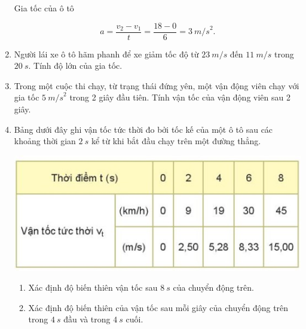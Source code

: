 \begin{enumerate}[label=\bfseries Bài \arabic*:]
{		Gia tốc của ô tô
		
		$$a = \dfrac{v_2 - v_1}{t} = \dfrac{18 - 0}{6} = \SI{3}{m/s}^2.$$
	}
	\item {}
	
	{
		Người lái xe ô tô hãm phanh để xe giảm tốc độ từ $\SI{23}{m/s}$ đến $\SI{11}{m/s}$ trong $\SI{20}{s}$. Tính độ lớn của gia tốc.
	}
	\item {}
	
	{
		Trong một cuộc thi chạy, từ trạng thái đứng yên, một vận động viên chạy với gia tốc $\SI{5}{m/s}^2$ trong 2 giây đầu tiên. Tính vận tốc của vận động viên sau 2 giây.
	}
	\item {}
	
	{
		Bảng dưới đây ghi vận tốc tức thời đo bởi tốc kế của một ô tô sau các khoảng thời gian $\SI{2}{s}$ kể từ khi bắt đầu chạy trên một đường thẳng.
		
		\begin{center}
			\includegraphics[scale=1]{../figs/VN10-2022-PH-TP007-1.jpg}
		\end{center}
		
		\begin{enumerate}[label=\alph*)]
			\item Xác định độ biến thiên vận tốc sau $\SI{8}{s}$ của chuyển động trên.
			\item Xác định độ biến thiên của vận tốc sau mỗi giây của chuyển động trên trong $\SI{4}{s}$ đầu và trong $\SI{4}{s}$ cuối.
		\end{enumerate}
	}
\end{enumerate}

